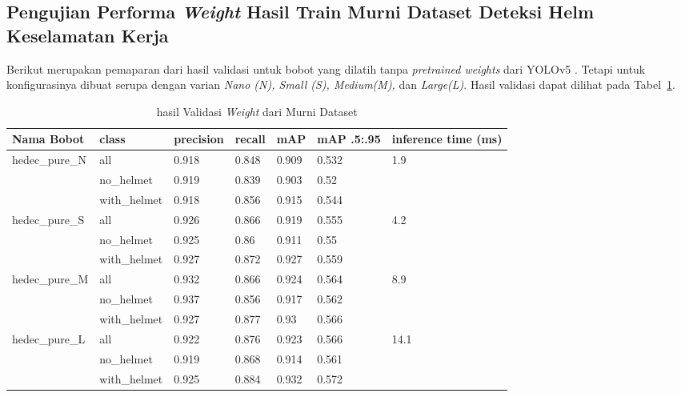 \subsection{Pengujian Performa \emph{Weight} Hasil Train Murni Dataset Deteksi Helm Keselamatan Kerja}
\label{subsec:murnidataset}

\par Berikut merupakan pemaparan dari hasil validasi untuk bobot yang dilatih tanpa \emph{pretrained weights}
dari YOLOv5 . Tetapi untuk konfigurasinya dibuat serupa dengan varian \emph{Nano (N), Small (S), Medium(M),} dan \emph{Large(L)}. 
Hasil validasi dapat dilihat pada Tabel~\ref{tb:nopretrain}.


\begin{longtable}{|l|l|l|l|l|l|l|} 
  \caption{hasil Validasi \emph{Weight} dari Murni Dataset}
  \label{tb:nopretrain}\\
  \hline
  Nama Bobot                          & class        & precision & recall & mAP   & mAP .5:.95 & inference time (ms)    \\ 
  \hline
  \multirow{3}{*}{hedec\_pure\_N}     & all          & 0.918     & 0.848  & 0.909 & 0.532      & \multirow{3}{*}{1.9}   \\
                                      & no\_helmet   & 0.919     & 0.839  & 0.903 & 0.52       &                        \\
                                      & with\_helmet & 0.918     & 0.856  & 0.915 & 0.544      &                        \\ 
  \hline
  \multirow{3}{*}{hedec\_pure\_S}     & all          & 0.926     & 0.866  & 0.919 & 0.555      & \multirow{3}{*}{4.2}   \\
                                      & no\_helmet   & 0.925     & 0.86   & 0.911 & 0.55       &                        \\
                                      & with\_helmet & 0.927     & 0.872  & 0.927 & 0.559      &                        \\ 
  \hline
  \multirow{3}{*}{hedec\_pure\_M}     & all          & 0.932     & 0.866  & 0.924 & 0.564      & \multirow{3}{*}{8.9}   \\
                                      & no\_helmet   & 0.937     & 0.856  & 0.917 & 0.562      &                        \\
                                      & with\_helmet & 0.927     & 0.877  & 0.93  & 0.566      &                        \\ 
  \hline
  \multirow{3}{*}{hedec\_pure\_L}     & all          & 0.922     & 0.876  & 0.923 & 0.566      & \multirow{3}{*}{14.1}  \\
                                      & no\_helmet   & 0.919     & 0.868  & 0.914 & 0.561      &                        \\
                                      & with\_helmet & 0.925     & 0.884  & 0.932 & 0.572      &                        \\
  \hline
\end{longtable}

